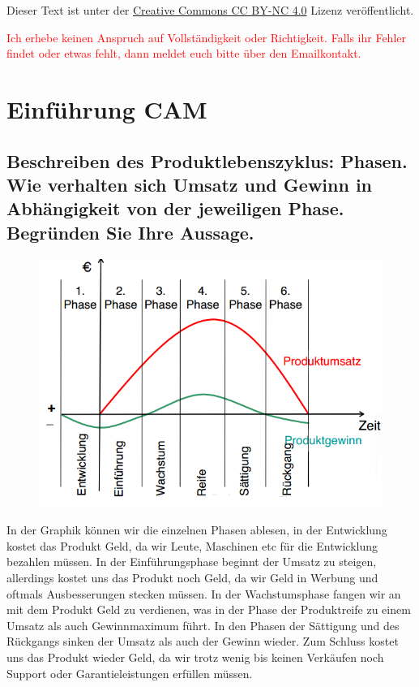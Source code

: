 
\usepackage{paralist}


\maketitle

Dieser Text ist unter der
\href{http://creativecommons.org/licenses/by-nc/4.0/}{Creative Commons CC BY-NC 4.0}
Lizenz veröffentlicht.

\textcolor{red}{%
    Ich erhebe keinen Anspruch auf Vollständigkeit oder Richtigkeit. Falls ihr
    Fehler findet oder etwas fehlt, dann meldet euch bitte über den
    Emailkontakt.
}

\tableofcontents

\newpage

\section{Einführung CAM}

\subsection*{%
    Beschreiben des Produktlebenszyklus: Phasen. Wie verhalten sich Umsatz und
    Gewinn in Abhängigkeit von der jeweiligen Phase. Begründen Sie Ihre
    Aussage.
}


\begin{figure}[h]
    \centering
    \includegraphics[scale=0.7]{Bild1_1.png}
\end{figure}

In der Graphik können wir die einzelnen Phasen ablesen, in der Entwicklung
kostet das Produkt Geld, da wir Leute, Maschinen etc für die Entwicklung
bezahlen müssen. In der Einführungsphase beginnt der Umsatz zu steigen,
allerdings kostet uns das Produkt noch Geld, da wir Geld in Werbung und oftmals
Ausbesserungen stecken müssen. In der Wachstumsphase fangen wir an mit dem
Produkt Geld zu verdienen, was in der Phase der Produktreife zu einem Umsatz
als auch Gewinnmaximum führt. In den Phasen der Sättigung und des Rückgangs
sinken der Umsatz als auch der Gewinn wieder. Zum Schluss kostet uns das
Produkt wieder Geld, da wir trotz wenig bis keinen Verkäufen noch Support oder
Garantieleistungen erfüllen müssen.

